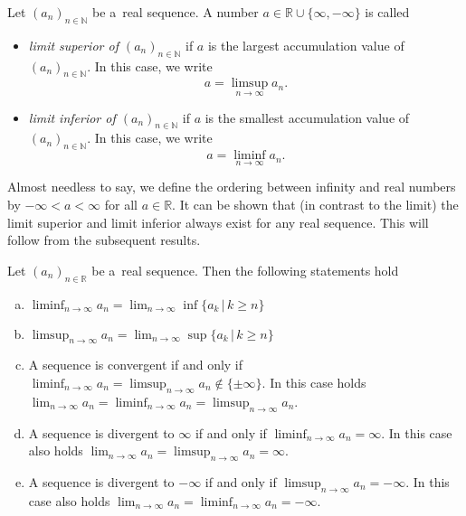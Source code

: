

\begin{Definition}
\label{defliminfsup}
Let $(a_n)_{n\in\mathbb{N}}$ be a~real sequence. A number $a\in\mathbb{R}\cup\{\infty,-\infty\}$ is called
\begin{itemize}
 \item \emph{limit superior of $(a_n)_{n\in\mathbb{N}}$} if $a$ is the largest accumulation value of $(a_n)_{n\in\mathbb{N}}$. In this case, we write
\[a=\limsup_{n\rightarrow\infty} a_n.\]
 \item \emph{limit inferior of $(a_n)_{n\in\mathbb{N}}$} if $a$ is the smallest accumulation value of $(a_n)_{n\in\mathbb{N}}$. In this case, we write
\[a=\liminf_{n\rightarrow\infty} a_n.\]
\end{itemize}
\end{Definition}

\begin{Remark}
Almost needless to say, we define the ordering between infinity and real numbers by $-\infty<a<\infty$ for all $a\in\mathbb{R}$. It can be shown that (in contrast to the limit) the limit superior and limit inferior always exist for any real sequence. This will follow from the subsequent results.
\end{Remark}

\begin{Lemma}
Let $(a_n)_{n\in\mathbb{R}}$ be a~real sequence. Then the following statements hold
\begin{enumerate}[a)]
\item
$\displaystyle \liminf_{n\rightarrow\infty} a_n=\lim_{n\rightarrow\infty}\inf\{a_k\,| \,k\geq n\}$ \\
\item
$\displaystyle \limsup_{n\rightarrow\infty} a_n=\lim_{n\rightarrow\infty}\sup\{a_k\,|\,k\geq n\}$ \\
\item
A sequence is convergent if and only if $\liminf_{n\rightarrow\infty} a_n=\limsup_{n\rightarrow\infty} a_n\not\in\{\pm\infty\}$. In this case holds $\lim_{n\rightarrow\infty}a_n=\liminf_{n\rightarrow\infty} a_n=\limsup_{n\rightarrow\infty} a_n$.\\
\item
A sequence is divergent to $\infty$ if and only if $\liminf_{n\rightarrow\infty} a_n=\infty$. In this case also holds $\lim_{n\rightarrow\infty}a_n=\limsup_{n\rightarrow\infty} a_n=\infty$.\\
\item
A sequence is divergent to $-\infty$ if and only if $\limsup_{n\rightarrow\infty} a_n=-\infty$. In this case also holds $\lim_{n\rightarrow\infty}a_n=\liminf_{n\rightarrow\infty} a_n=-\infty$.\\
\end{enumerate}

\end{Lemma}

